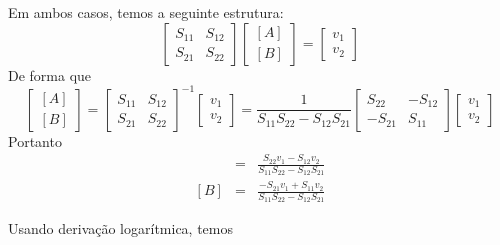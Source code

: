 \begin{resol}
Em ambos casos, temos a seguinte estrutura:
\begin{equation}
\begin{bmatrix}
S_{11}& S_{12}\\
S_{21}& S_{22}
\end{bmatrix}
\begin{bmatrix}
\left[ A\right]\\
\left[ B\right]
\end{bmatrix}
=
\begin{bmatrix}
v_1\\
v_2
\end{bmatrix}
\end{equation}
De forma que
\begin{equation}
\begin{bmatrix}
\left[ A\right]\\
\left[ B\right]
\end{bmatrix}
=\begin{bmatrix}
S_{11}& S_{12}\\
S_{21}& S_{22}
\end{bmatrix}^{-1}
\begin{bmatrix}
v_1\\
v_2
\end{bmatrix}
= \frac{1}{S_{11}S_{22}-S_{12}S_{21}}
\begin{bmatrix}
S_{22}& -S_{12}\\
-S_{21}& S_{11}
\end{bmatrix}
\begin{bmatrix}
v_1\\
v_2
\end{bmatrix}
\end{equation}
Portanto
\begin{eqnarray}
[ A ]&=&\frac{S_{22}v_1-S_{12}v_2}{S_{11}S_{22}-S_{12}S_{21}}\\
\left[ {B} \right]&=&\frac{-S_{21}v_1+S_{11}v_2}{S_{11}S_{22}-S_{12}S_{21}}
\end{eqnarray}

Usando derivação logarítmica, temos


\end{resol}
